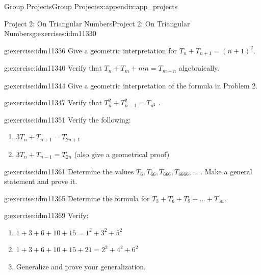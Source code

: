 \documentclass[oneside,10pt,]{book}
\numberwithin{equation}{chapter}
\begin{document}
\begin{appendixptx}{Group Projects}{}{Group Projects}{}{}{x:appendix:app_projects}
\begin{exercises-section-numberless}{Project 2: On Triangular Numbers}{}{Project 2: On Triangular Numbers}{}{}{g:exercises:idm11330}
\begin{divisionexercise}{1}{}{}{g:exercise:idm11336}
Give a geometric interpretation for \(T_{n} + T_{n + 1} = \left( n + 1 \right)^{2}.\)%
\end{divisionexercise}%
\begin{divisionexercise}{2}{}{}{g:exercise:idm11340}%
Verify that \(T_{n} + T_{m} + mn = T_{m + n}\) algebraically.%
\end{divisionexercise}%
\begin{divisionexercise}{3}{}{}{g:exercise:idm11344}%
Give a geometric interpretation of the formula in Problem 2.%
\end{divisionexercise}%
\begin{divisionexercise}{4}{}{}{g:exercise:idm11347}%
Verify that \(T_{n}^{2} + T_{n - 1}^{2} = T_{n^{2}}\) .%
\end{divisionexercise}%
\begin{divisionexercise}{5}{}{}{g:exercise:idm11351}%
Verify the following:%
\begin{enumerate}[label=(\alph*)]
\item{}\(3T_{n} + T_{n + 1} = T_{2n + 1}\)%
\item{}\(3T_{n} + T_{n - 1} = T_{2n}\) (also give a geometrical proof)%
\end{enumerate}
%
\end{divisionexercise}%
\begin{divisionexercise}{6}{}{}{g:exercise:idm11361}%
Determine the values \(T_{6},T_{66},T_{666},T_{6666},\ldots\) . Make a general statement and prove it.%
\end{divisionexercise}%
\begin{divisionexercise}{7}{}{}{g:exercise:idm11365}%
Determine the formula for \(T_{3} + T_{6} + T_{9} + \ldots + T_{3n}.\)%
\end{divisionexercise}%
\begin{divisionexercise}{8}{}{}{g:exercise:idm11369}%
Verify:%
\begin{enumerate}[label=(\alph*)]
\item{}\(1 + 3 + 6 + 10 + 15 = 1^{2} + 3^{2} + 5^{2}\)%
\item{}\(1 + 3 + 6 + 10 + 15 + 21 = 2^{2} + 4^{2} + 6^{2}\)%
\item{}Generalize and prove your generalization.%
\end{enumerate}
%
\end{divisionexercise}%
\end{exercises-section-numberless}
%
%
\typeout{************************************************}
\typeout{************************************************}

\end{appendixptx}
\end{document}
